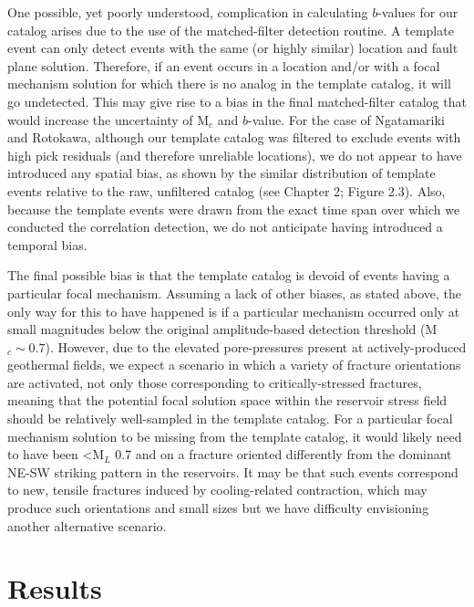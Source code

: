 One possible, yet poorly understood, complication in calculating $b$-values for our catalog arises due to the use of the matched-filter detection routine. A template event can only detect events with the same (or highly similar) location and fault plane solution. Therefore, if an event occurs in a location and/or with a focal mechanism solution for which there is no analog in the template catalog, it will go undetected. This may give rise to a bias in the final matched-filter catalog that would increase the uncertainty of M$_{c}$ and $b$-value. For the case of Ngatamariki and Rotokawa, although our template catalog was filtered to exclude events with high pick residuals (and therefore unreliable locations), we do not appear to have introduced any spatial bias, as shown by the similar distribution of template events relative to the raw, unfiltered catalog (see Chapter 2; Figure 2.3). Also, because the template events were drawn from the exact time span over which we conducted the correlation detection, we do not anticipate having introduced a temporal bias.

The final possible bias is that the template catalog is devoid of events having a particular focal mechanism. Assuming a lack of other biases, as stated above, the only way for this to have happened is if a particular mechanism occurred only at small magnitudes below the original amplitude-based detection threshold (M$_{c}\sim{0.7}$). However, due to the elevated pore-pressures present at actively-produced geothermal fields, we expect a scenario in which a variety of fracture orientations are activated, not only those corresponding to critically-stressed fractures, meaning that the potential focal solution space within the reservoir stress field should be relatively well-sampled in the template catalog. For a particular focal mechanism solution to be missing from the template catalog, it would likely need to have been \textless M$_{L}$ 0.7 and on a fracture oriented differently from the dominant NE-SW striking pattern in the reservoirs. It may be that such events correspond to new, tensile fractures induced by cooling-related contraction, which may produce such orientations and small sizes \citep{stephens1982hydraulic,Wiemer_1998} but we have difficulty envisioning another alternative scenario.

\section{Results}
